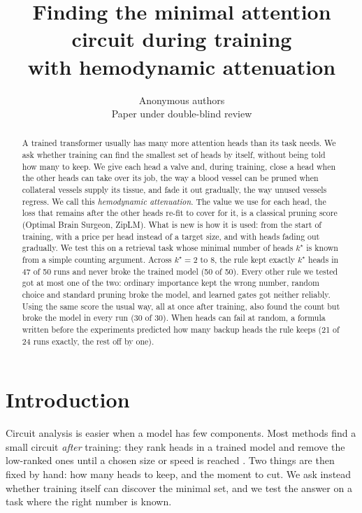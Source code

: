 \documentclass[11pt]{article}
\title{\bfseries Finding the minimal attention circuit during training\\
       with hemodynamic attenuation}
\author{Anonymous authors\\ \small Paper under double-blind review}
\date{}
\begin{document}
\maketitle

\begin{abstract}
\noindent
A trained transformer usually has many more attention heads than its task needs. We ask
whether training can find the smallest set of heads by itself, without being told how many
to keep. We give each head a valve and, during training, close a head when the other heads
can take over its job, the way a blood vessel can be pruned when collateral vessels supply
its tissue, and fade it out gradually, the way unused vessels regress. We call this
\emph{hemodynamic attenuation}. The value we use for each head, the loss that remains after the other heads
re-fit to cover for it, is a classical pruning score (Optimal Brain Surgeon, ZipLM). What is
new is how it is used: from the start of training, with a price per head instead of a target
size, and with heads fading out gradually. We test this on a retrieval task whose minimal
number of heads $k^\star$ is known from a simple counting argument. Across $k^\star = 2$ to $8$,
the rule kept exactly $k^\star$ heads in 47 of 50 runs and never broke the trained model (50 of 50).
Every other rule we tested got at most one of the two: ordinary importance kept the wrong number,
random choice and standard pruning broke the model, and learned gates got neither reliably. Using the same
score the usual way, all at once after training, also found the count but broke the model in
every run (30 of 30). When heads can fail at random, a formula written before the experiments
predicted how many backup heads the rule keeps (21 of 24 runs exactly, the rest off by one).
\end{abstract}

\section{Introduction}

Circuit analysis is easier when a model has few components. Most methods find a small circuit
\emph{after} training: they rank heads in a trained model and remove the low-ranked ones until a
chosen size or speed is reached \citep{michel,voita,ziplm,kwon}. Two things are then fixed by
hand: how many heads to keep, and the moment to cut. We ask instead whether training itself can
discover the minimal set, and we test the answer on a task where the right number is known.
\end{document}
